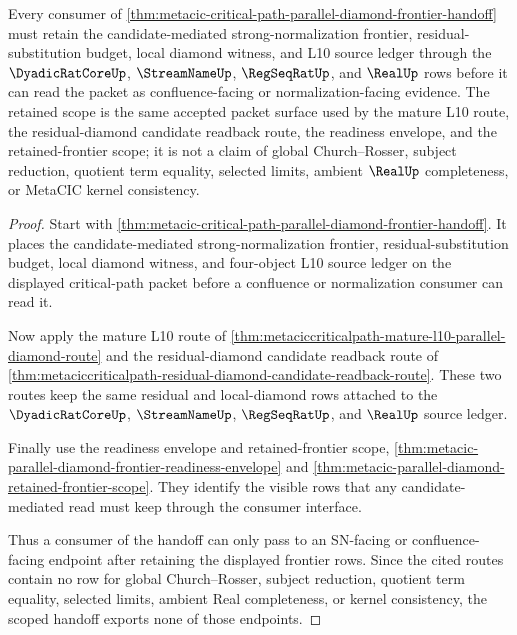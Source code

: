 \begin{theorem}
\label{thm:metacic-critical-path-parallel-diamond-frontier-handoff-scope}
Every consumer of \autoref{thm:metacic-critical-path-parallel-diamond-frontier-handoff} must retain the candidate-mediated strong-normalization frontier, residual-substitution budget, local diamond witness, and L10 source ledger through the $\DyadicRatCoreUp$, $\StreamNameUp$, $\RegSeqRatUp$, and $\RealUp$ rows before it can read the packet as confluence-facing or normalization-facing evidence. The retained scope is the same accepted packet surface used by the mature L10 route, the residual-diamond candidate readback route, the readiness envelope, and the retained-frontier scope; it is not a claim of global Church--Rosser, subject reduction, quotient term equality, selected limits, ambient $\RealUp$ completeness, or MetaCIC kernel consistency.
\end{theorem}
\begin{proof}
Start with \autoref{thm:metacic-critical-path-parallel-diamond-frontier-handoff}. It places the candidate-mediated strong-normalization frontier, residual-substitution budget, local diamond witness, and four-object L10 source ledger on the displayed critical-path packet before a confluence or normalization consumer can read it.

Now apply the mature L10 route of \autoref{thm:metaciccriticalpath-mature-l10-parallel-diamond-route} and the residual-diamond candidate readback route of \autoref{thm:metaciccriticalpath-residual-diamond-candidate-readback-route}. These two routes keep the same residual and local-diamond rows attached to the $\DyadicRatCoreUp$, $\StreamNameUp$, $\RegSeqRatUp$, and $\RealUp$ source ledger.

Finally use the readiness envelope and retained-frontier scope, \autoref{thm:metacic-parallel-diamond-frontier-readiness-envelope} and \autoref{thm:metacic-parallel-diamond-retained-frontier-scope}. They identify the visible rows that any candidate-mediated read must keep through the consumer interface.

Thus a consumer of the handoff can only pass to an SN-facing or confluence-facing endpoint after retaining the displayed frontier rows. Since the cited routes contain no row for global Church--Rosser, subject reduction, quotient term equality, selected limits, ambient Real completeness, or kernel consistency, the scoped handoff exports none of those endpoints.
\end{proof}

